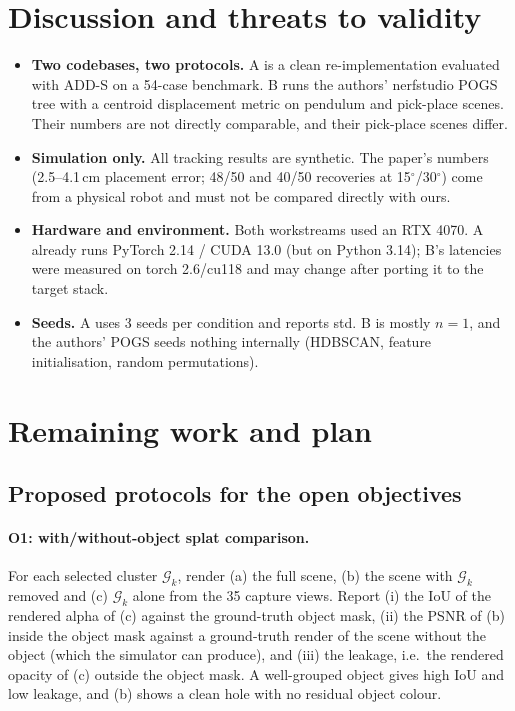 \documentclass[10pt,a4paper]{article}
\begin{document}
\section{Discussion and threats to validity}
\begin{itemize}
\item \textbf{Two codebases, two protocols.} A is a clean re-implementation evaluated with ADD-S on
      a 54-case benchmark. B runs the authors' nerfstudio POGS tree with a centroid displacement
      metric on pendulum and pick-place scenes. Their numbers are not directly comparable, and
      their pick-place scenes differ.
\item \textbf{Simulation only.} All tracking results are synthetic. The paper's numbers (2.5--4.1\,cm
      placement error; 48/50 and 40/50 recoveries at 15$^\circ$/30$^\circ$) come from a physical robot
      and must not be compared directly with ours.
\item \textbf{Hardware and environment.} Both workstreams used an RTX 4070. A already runs PyTorch 2.14 /
      CUDA 13.0 (but on Python 3.14); B's latencies were measured on torch 2.6/cu118 and may change
      after porting it to the target stack.
\item \textbf{Seeds.} A uses 3 seeds per condition and reports std. B is mostly $n=1$, and the
      authors' POGS seeds nothing internally (HDBSCAN, feature initialisation, random permutations).
\end{itemize}

\section{Remaining work and plan}
\label{sec:plan}
\subsection{Proposed protocols for the open objectives}
\paragraph{O1: with/without-object splat comparison.}
For each selected cluster $\mathcal{G}_k$, render (a) the full scene, (b) the scene with
$\mathcal{G}_k$ removed and (c) $\mathcal{G}_k$ alone from the 35 capture views. Report
(i) the IoU of the rendered alpha of (c) against the ground-truth object mask, (ii) the PSNR of (b)
inside the object mask against a ground-truth render of the scene without the object (which the
simulator can produce), and (iii) the leakage, i.e.\ the rendered opacity of (c) outside the object
mask. A well-grouped object gives high IoU and low leakage, and (b) shows a clean hole with no
residual object colour.
\end{document}
